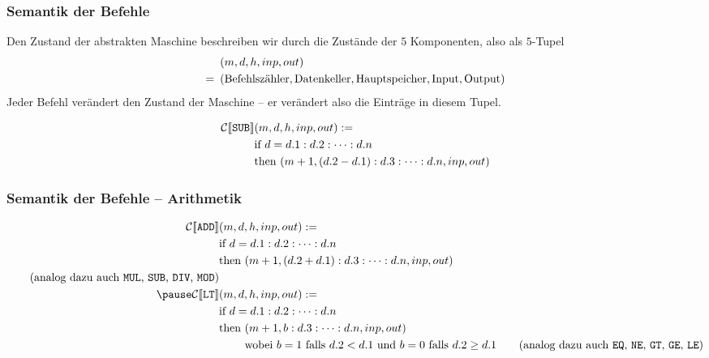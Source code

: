 \documentclass{beamer}
\begin{document}
\begin{frame} \frametitle{Semantik der Befehle}
	\footnotesize
	Den Zustand der abstrakten Maschine beschreiben wir durch die Zustände der $5$ Komponenten, also als $5$-Tupel
	\begin{align*}
		&(m,d,h,inp,out)\\
		= \enskip &(\text{Befehlszähler}, \text{Datenkeller}, \text{Hauptspeicher}, \text{Input}, \text{Output})
	\end{align*}
	Jeder Befehl verändert den Zustand der Maschine -- er verändert also die Einträge in diesem Tupel.
	
	\begin{align*}
		\mathcal{C} [\![ \texttt{SUB} ]\!] &(m,d,h,inp,out) \mathrel{:=}  \\
		&\text{if } d = d.1 : d.2 : \dots : d.n \\
		&\text{then } (m+1, (d.2 - d.1) : d.3 : \dots : d.n, inp, out) 
	\end{align*}
\end{frame}


\begin{frame} \frametitle{Semantik der Befehle -- Arithmetik}
	\small
	\begin{align*}
		\mathcal{C} [\![ \texttt{ADD} ]\!] &(m,d,h,inp,out) \defeq  \\
		&\text{if } d = d.1 : d.2 : \dots : d.n \\
		&\text{then } (m+1, (d.2 + d.1) : d.3 : \dots : d.n, inp, out) \\ 
		\tag{analog dazu auch \texttt{MUL}, \texttt{SUB}, \texttt{DIV}, \texttt{MOD}} \\ \pause
		\mathcal{C} [\![ \texttt{LT} ]\!] &(m,d,h,inp,out) \defeq  \\
		&\text{if } d = d.1 : d.2 : \dots : d.n \\
		&\text{then } (m+1, b : d.3 : \dots : d.n, inp, out) \\
		&\phantom{\text{then }} \text{wobei } b = 1 \text{ falls } d.2 < d.1 \text{ und } b = 0 \text{ falls } d.2 \ge d.1
		\tag{analog dazu auch \texttt{EQ}, \texttt{NE}, \texttt{GT}, \texttt{GE}, \texttt{LE}} 
	\end{align*}
\end{frame}
\end{document}

